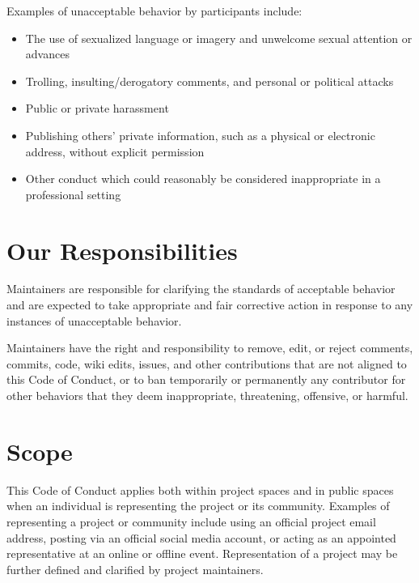 \documentclass[letterpaper,10pt,english]{sphinxmanual}
\begin{document}
\sphinxAtStartPar
Examples of unacceptable behavior by participants include:
\begin{itemize}
\item {} 
\sphinxAtStartPar
The use of sexualized language or imagery and unwelcome sexual attention or
advances

\item {} 
\sphinxAtStartPar
Trolling, insulting/derogatory comments, and personal or political attacks

\item {} 
\sphinxAtStartPar
Public or private harassment

\item {} 
\sphinxAtStartPar
Publishing others’ private information, such as a physical or electronic
address, without explicit permission

\item {} 
\sphinxAtStartPar
Other conduct which could reasonably be considered inappropriate in a
professional setting

\end{itemize}


\section{Our Responsibilities}
\label{\detokenize{Code-of-conduct:our-responsibilities}}
\sphinxAtStartPar
Maintainers are responsible for clarifying the standards of acceptable behavior
and are expected to take appropriate and fair corrective action in response to
any instances of unacceptable behavior.

\sphinxAtStartPar
Maintainers have the right and responsibility to remove, edit, or reject
comments, commits, code, wiki edits, issues, and other contributions that are
not aligned to this Code of Conduct, or to ban temporarily or permanently any
contributor for other behaviors that they deem inappropriate, threatening,
offensive, or harmful.


\section{Scope}
\label{\detokenize{Code-of-conduct:scope}}
\sphinxAtStartPar
This Code of Conduct applies both within project spaces and in public spaces
when an individual is representing the project or its community. Examples of
representing a project or community include using an official project e\sphinxhyphen{}mail
address, posting via an official social media account, or acting as an appointed
representative at an online or offline event. Representation of a project may be
further defined and clarified by project maintainers.
\end{document}

